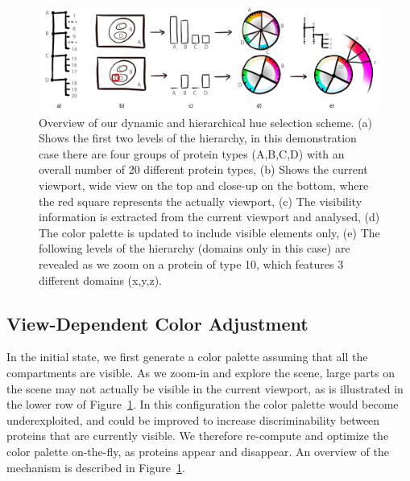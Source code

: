 \documentclass[review,journal]{vgtc}         %
\begin{document}
	
	
	\begin{figure}[t]
		\centering
		\includegraphics[width=0.95\linewidth]{Figures/coloroverview}
		\caption{Overview of our dynamic and hierarchical hue selection scheme. (a) Shows the first two levels of the hierarchy, in this demonstration case there are four groups of protein types (A,B,C,D) with an overall number of 20 different protein types, (b) Shows the current viewport, wide view on the top and close-up on the bottom, where the red square represents the actually viewport, (c) The visibility information is extracted from the current viewport and analysed, (d) The color palette is updated to include visible elements only, (e) The following levels of the hierarchy (domains only in this case) are revealed as we zoom on a protein of type 10, which features 3 different domains (x,y,z).}
		\label{fig:coloroverview}
	\end{figure}
	
	\subsection{View-Dependent Color Adjustment}
	\label{sec:dynamic}
	
	In the initial state, we first generate a color palette assuming that all the compartments are visible.
	As we zoom-in and explore the scene, large parts on the scene may not actually be visible in the current viewport, as is illustrated in the lower row of Figure~\ref{fig:coloroverview}.
	In this configuration the color palette would become underexploited, and could be improved to increase discriminability between proteins that are currently visible. 
	We therefore re-compute and optimize the color palette on-the-fly, as proteins appear and disappear.
	An overview of the mechanism is described in Figure~\ref{fig:coloroverview}.
	
\end{document}
